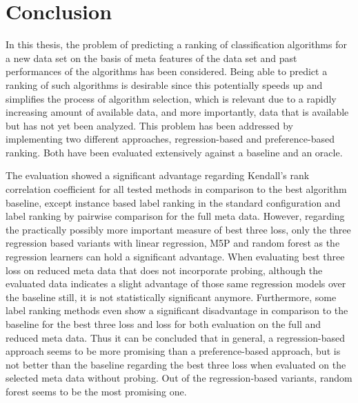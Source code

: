 \chapter{Conclusion}
\label{sec:conclusion}
In this thesis, the problem of predicting a ranking of classification algorithms for a new data set on the basis of meta features of the data set and past performances of the algorithms has been considered. Being able to predict a ranking of such algorithms is desirable since this potentially speeds up and simplifies the process of algorithm selection, which is relevant due to a rapidly increasing amount of available data, and more importantly, data that is available but has not yet been analyzed. This problem has been addressed by implementing two different approaches, regression-based and preference-based ranking. Both have been evaluated extensively against a baseline and an oracle.

The evaluation showed a significant advantage regarding Kendall's rank correlation coefficient for all tested methods in comparison to the best algorithm baseline, except instance based label ranking in the standard configuration and label ranking by pairwise comparison for the full meta data. However, regarding the practically possibly more important measure of best three loss, only the three regression based variants with linear regression, M5P and random forest as the regression learners can hold a significant advantage. When evaluating best three loss on reduced meta data that does not incorporate probing, although the evaluated data indicates a slight advantage of those same regression models over the baseline still, it is not statistically significant anymore. Furthermore, some label ranking methods even show a significant disadvantage in comparison to the baseline for the best three loss and loss for both evaluation on the full and reduced meta data. Thus it can be concluded that in general, a regression-based approach seems to be more promising than a preference-based approach, but is not better than the baseline regarding the best three loss when evaluated on the selected meta data without probing. Out of the regression-based variants, random forest seems to be the most promising one.

